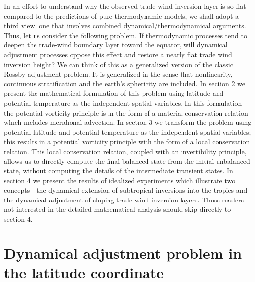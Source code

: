      In an effort to understand why the observed trade-wind inversion layer is
so flat compared to the predictions of pure thermodynamic models, we shall
adopt a third view, one that involves combined dynamical/thermodynamical
arguments. Thus, let us consider the following problem.  If thermodynamic
processes tend to deepen the trade-wind boundary layer toward the equator,
will dynamical adjustment processes oppose this effect and restore a nearly
flat trade wind inversion height?  We can think of this as a generalized
version of the classic Rossby adjustment problem.  It is generalized in the
sense that nonlinearity, continuous stratification and the earth's sphericity
are included.  In section 2 we present the mathematical formulation of this
problem using latitude and potential temperature as the independent spatial
variables.  In this formulation the potential vorticity principle is in the
form of a material conservation relation which includes meridional advection. 
In section 3 we transform the problem using potential latitude and potential
temperature as the independent spatial variables; this results in a potential
vorticity principle with the form of a local conservation relation.  This
local conservation relation, coupled with an invertibility principle, allows
us to directly compute the final balanced state from the initial unbalanced
state, without computing the details of the intermediate transient states.  In
section 4 we present the results of idealized experiments which illustrate two
concepts---the dynamical extension of subtropical inversions into the tropics
and the dynamical adjustment of sloping trade-wind inversion layers.  Those
readers not interested in the detailed mathematical analysis should skip
directly to section 4.

\vfill
\eject

\section{Dynamical adjustment problem in the latitude coordinate}


